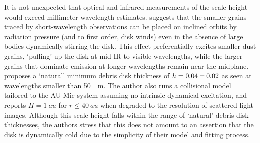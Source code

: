 \documentclass[modern]{aastex62}
\begin{document}
It is not unexpected that optical and infrared measurements of the scale height would exceed millimeter-wavelength estimates.
\cite{thebault09} suggests that the smaller grains traced by short-wavelength observations can be placed on inclined orbits by radiation pressure (and to first order, disk winds) even in the absence of large bodies dynamically stirring the disk. 
This effect preferentially excites smaller dust grains, `puffing' up the disk at mid-IR to visible wavelengths, while the larger grains that dominate emission at longer wavelengths remain near the midplane.
\cite{thebault09} proposes a `natural' minimum debris disk thickness of $h = \num{0.04 \pm 0.02}$ as seen at wavelengths smaller than \SI{50}{\mu \meter}.
The author also runs a collisional model tailored to the AU Mic system assuming no intrinsic dynamical excitation, and reports $H = \SI{1}{au}$ for $r \leq \SI{40}{au}$ when degraded to the resolution of scattered light images.
Although this scale height falls within the range of `natural' debris disk thicknesses, the authors stress that this does not amount to an assertion that the disk is dynamically cold due to the simplicity of their model and fitting process.
\end{document}
